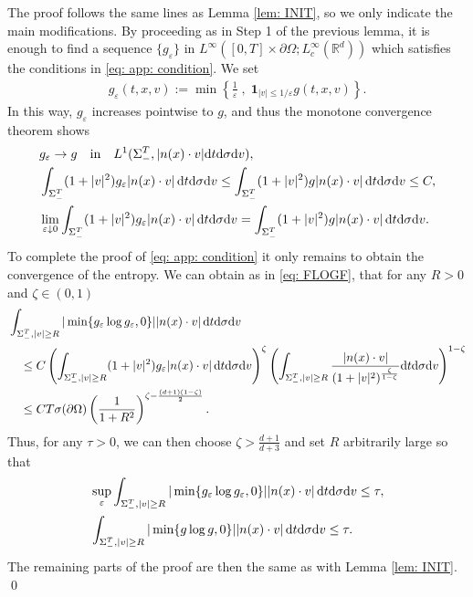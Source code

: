\documentclass[10pt, reqno]{amsart}
\theoremstyle{plain}
\theoremstyle{definition}
\theoremstyle{remark}
\renewenvironment{proof}[1][\proofname]{\noindent{\scshape #1.\quad}}{\qed}
\numberwithin{equation}{section}
\newcommand{\p}{\partial}
\newcommand{\R}{\mathbb{R}}
\newcommand{\ve}{\varepsilon}
\newcommand{\dv}{\textnormal{d}v}
\newcommand{\dt}{\textnormal{d}t}
\newcommand{\tnd}{\textnormal{d}}
\newcommand{\lt}{\left}
\newcommand{\rt}{\right}
\begin{document}
\begin{proof}
The proof follows the same lines as Lemma \ref{lem: INIT}, so we only indicate the main modifications. By proceeding as in Step 1 of the previous lemma, it is enough to find a sequence $\{g_\ve\}$ in $L^\infty([0,T]\times \p\Omega; L^\infty_c(\R^d))$ which satisfies the conditions in \eqref{eq: app: condition}. We set
    \begin{align*}
        g_\ve(t,x,v) := \min\lt\{ \frac{1}{\ve} \; , \; \mathbf{1}_{|v|\le 1/\ve} g(t,x,v)  \rt\}.
    \end{align*}
    In this way, $g_\ve$ increases pointwise to $g$, and thus the monotone convergence theorem shows
    \begin{align*}
        &g_\ve \to g \quad \text{in} \quad L^1(\Sigma_-^T, |n(x)\cdot v| \dt\tnd\sigma\dv),\\
        &\int_{\Sigma_-^T} (1 + |v|^2) g_\ve |n(x)\cdot v| \,\dt\tnd\sigma\dv \le \int_{\Sigma_-^T} (1 + |v|^2) g |n(x)\cdot v| \,\dt\tnd\sigma\dv \le  C,\\
        &\lim_{\ve\downarrow 0} \int_{\Sigma_-^T} (1+|v|^2) g_\ve |n(x)\cdot v| \,\dt\tnd\sigma\dv = \int_{\Sigma_-^T} (1+|v|^2) g |n(x)\cdot v| \,\dt\tnd\sigma\dv.
    \end{align*}
    To complete the proof of \eqref{eq: app: condition} it only remains to obtain the convergence of the entropy. We can obtain as in \eqref{eq: FLOGF}, that for any $R>0$ and $\zeta\in (0,1)$
    \begin{align*}
        &\int_{\Sigma_-^T , |v|\ge R} |\min\{g_\ve \log g_\ve, 0\}| |n(x)\cdot v| \,\dt\tnd\sigma\dv \\
        &\quad \le C \lt(\int_{\Sigma_-^T, |v|\ge R} (1+|v|^2) g_\ve |n(x)\cdot v| \,\dt\tnd\sigma\dv \rt)^\zeta \lt(\int_{\Sigma_-^T, |v|\ge R} \frac{|n(x)\cdot v|}{(1+|v|^2)^{\frac{\zeta}{1-\zeta}}} \dt\tnd\sigma\dv \rt)^{1-\zeta} \\
        &\quad  \le C T \sigma(\p\Omega) \lt(\frac{1}{1+R^2}\rt)^{\zeta - \frac{(d+1)(1-\zeta)}{2}}.
    \end{align*}
    Thus, for any $\tau>0$, we can then choose $\zeta > \frac{d+1}{d+3}$ and set $R$ arbitrarily large so that
    \begin{align*}
        &\sup_\ve \int_{\Sigma_-^T, |v|\ge R} |\min\{g_\ve\log g_\ve, 0\}| |n(x)\cdot v| \,\dt\tnd\sigma\dv \le \tau,\\
        &\int_{\Sigma_-^T, |v|\ge R} |\min\{g\log g, 0\}| |n(x)\cdot v| \,\dt\tnd\sigma\dv \le \tau.
    \end{align*}
    The remaining parts of the proof are then the same as with Lemma \ref{lem: INIT}.
\end{proof}
\end{document}

